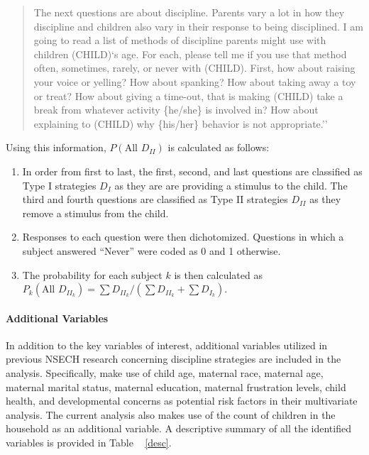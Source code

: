 \begin{quote}
The next questions are about discipline. Parents vary a lot in how they
discipline and children also vary in their response to being
disciplined. I am going to read a list of methods of discipline parents
might use with children (CHILD)`s age. For each, please tell me if you
use that method often, sometimes, rarely, or never with (CHILD). First,
how about raising your voice or yelling? How about spanking? How about
taking away a toy or treat? How about giving a time-out, that is making
(CHILD) take a break from whatever activity \{he/she\} is involved in?
How about explaining to (CHILD) why \{his/her\} behavior is not
appropriate.''
\end{quote}

Using this information, $P(\text{All } D_{II})$ is calculated as
follows:

\begin{enumerate}
\def\labelenumi{\arabic{enumi}.}
\itemsep1pt\parskip0pt
\item
  In order from first to last, the first, second, and last questions are
  classified as Type I strategies $D_I$ as they are are providing a
  stimulus to the child. The third and fourth questions are classified
  as Type II strategies $D_{II}$ as they remove a stimulus from the
  child.
\item
  Responses to each question were then dichotomized. Questions in which
  a subject answered ``Never'' were coded as 0 and 1 otherwise.
\item
  The probability for each subject $k$ is then calculated as\\
  $P_k(\text{All }D_{II_k})=\sum{D_{II_k}}/(\sum{D_{II_k}}+\sum{D_{I_k}})$.
\end{enumerate}

\paragraph{Additional Variables}\label{additional-variables}

In addition to the key variables of interest, additional variables
utilized in previous NSECH research concerning discipline strategies are
included in the analysis. Specifically, \citet{Regalado2004} make use of child age, maternal race, maternal
age, maternal marital status, maternal education, maternal frustration
levels, child health, and developmental concerns as potential risk
factors in their multivariate analysis. The current analysis also makes
use of the count of children in the household as an additional variable.
A descriptive summary of all the identified variables is provided in Table ~ \ref{desc}. 

